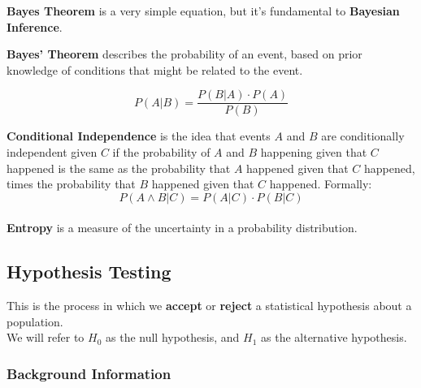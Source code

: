 \documentclass[english, 10pt]{article}
\begin{document}
\textbf{Bayes Theorem} is a very simple equation, but it's fundamental to \textbf{Bayesian Inference}.\\

\begin{tcolorbox}[title=Aside: Bayes' Theorem,colframe=black,colback=white,arc=0pt,fonttitle=\bfseries]
\textbf{Bayes' Theorem} describes the probability of an event, based on prior knowledge of conditions that might be related to the event.

$$ P(A|B) = \frac{P(B|A) \cdot P(A)}{P(B)} $$
\end{tcolorbox}

\hfill \break \textbf{Conditional Independence} is the idea that events $A$ and $B$ are conditionally independent given $C$ if the probability of $A$ and $B$ happening given that $C$ happened is the same as the probability that $A$ happened given that $C$ happened, times the probability that $B$ happened given that $C$ happened. Formally: $$P(A \land B | C) = P(A|C) \cdot P(B|C)$$\\

\textbf{Entropy} is a measure of the uncertainty in a probability distribution.

\subsection{Hypothesis Testing}

This is the process in which we \textbf{accept} or \textbf{reject} a statistical hypothesis about a population.\\

We will refer to $H_0$ as the null hypothesis, and $H_1$ as the alternative hypothesis.\\

\subsubsection{Background Information}
\end{document}
